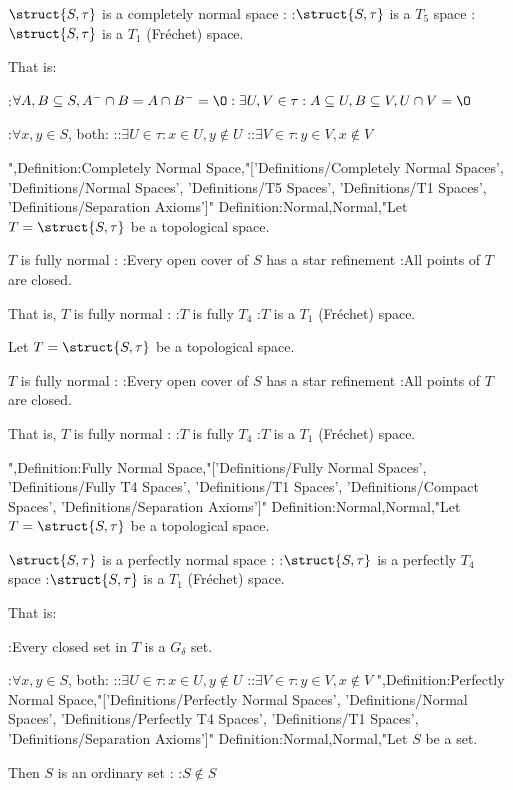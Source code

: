 $\struct {S, \tau}$ is a completely normal space :
:$\struct {S, \tau}$ is a $T_5$ space
:$\struct {S, \tau}$ is a $T_1$ (Fréchet) space.


That is:

:$\forall A, B \subseteq S, A^- \cap B = A \cap B^- = \O: \exists U, V \in \tau: A \subseteq U, B \subseteq V, U \cap V = \O$ 

:$\forall x, y \in S$, both:
::$\exists U \in \tau: x \in U, y \notin U$
::$\exists V \in \tau: y \in V, x \notin V$


",Definition:Completely Normal Space,"['Definitions/Completely Normal Spaces', 'Definitions/Normal Spaces', 'Definitions/T5 Spaces', 'Definitions/T1 Spaces', 'Definitions/Separation Axioms']"
Definition:Normal,Normal,"Let $T = \struct {S, \tau}$ be a topological space.


$T$ is fully normal :
:Every open cover of $S$ has a star refinement
:All points of $T$ are closed.


That is, $T$ is fully normal :
:$T$ is fully $T_4$
:$T$ is a $T_1$ (Fréchet) space.


Let $T = \struct {S, \tau}$ be a topological space.


$T$ is fully normal :
:Every open cover of $S$ has a star refinement
:All points of $T$ are closed.


That is, $T$ is fully normal :
:$T$ is fully $T_4$
:$T$ is a $T_1$ (Fréchet) space.


",Definition:Fully Normal Space,"['Definitions/Fully Normal Spaces', 'Definitions/Fully T4 Spaces', 'Definitions/T1 Spaces', 'Definitions/Compact Spaces', 'Definitions/Separation Axioms']"
Definition:Normal,Normal,"Let $T = \struct {S, \tau}$ be a topological space.


$\struct {S, \tau}$ is a perfectly normal space :
:$\struct {S, \tau}$ is a perfectly $T_4$ space
:$\struct {S, \tau}$ is a $T_1$ (Fréchet) space.


That is:

:Every closed set in $T$ is a $G_\delta$ set.

:$\forall x, y \in S$, both:
::$\exists U \in \tau: x \in U, y \notin U$
::$\exists V \in \tau: y \in V, x \notin V$
",Definition:Perfectly Normal Space,"['Definitions/Perfectly Normal Spaces', 'Definitions/Normal Spaces', 'Definitions/Perfectly T4 Spaces', 'Definitions/T1 Spaces', 'Definitions/Separation Axioms']"
Definition:Normal,Normal,"Let $S$ be a set.

Then $S$ is an ordinary set :
:$S \notin S$

